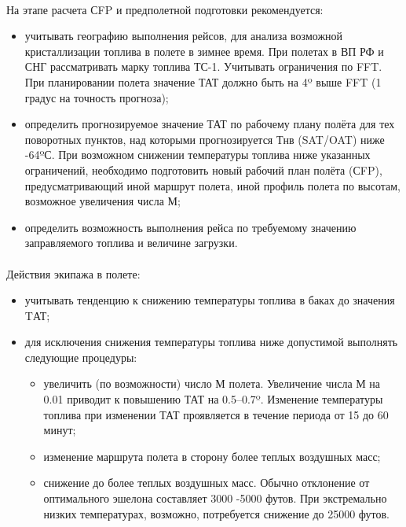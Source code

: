 \paragraph{} На этапе расчета СFP и предполетной подготовки рекомендуется:

\begin{itemize}
    \item учитывать географию выполнения рейсов, для анализа возможной кристаллизации топлива в полете в зимнее время. При полетах в ВП РФ и СНГ рассматривать марку топлива ТС-1. Учитывать ограничения по FFT. При планировании полета значение ТАТ должно быть на 4º выше FFT (1 градус на точность прогноза);
    \item определить прогнозируемое значение ТАТ по рабочему плану полёта для тех поворотных пунктов, над которыми прогнозируется Тнв (SAT/OAT) ниже -64ºС. При возможном снижении температуры топлива ниже указанных ограничений, необходимо подготовить новый рабочий план полёта (СFP), предусматривающий иной маршрут полета, иной профиль полета по высотам, возможное увеличения числа М;
    \item определить возможность выполнения рейса по требуемому значению заправляемого топлива и величине загрузки.
\end{itemize}

\paragraph{} Действия экипажа в полете:

\begin{itemize}
    \item учитывать тенденцию к снижению температуры топлива в баках до значения TАТ;
    \item для исключения снижения температуры топлива ниже допустимой выполнять следующие процедуры:    
    \begin{itemize}
        \item увеличить (по возможности) число М полета. Увеличение числа М на 0.01 приводит к повышению ТАТ на 0.5–0.7º. Изменение температуры топлива при изменении ТАТ проявляется в течение периода от 15 до 60 минут;
        \item изменение маршрута полета в сторону более теплых воздушных масс;
        \item снижение до более теплых воздушных масс. Обычно отклонение от оптимального эшелона составляет 3000 -5000 футов. При экстремально низких температурах, возможно, потребуется снижение до 25000 футов.
    \end{itemize}
\end{itemize}
